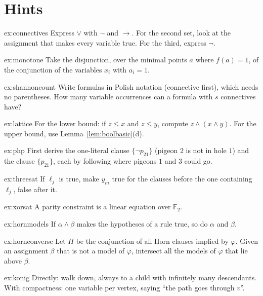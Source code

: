 \section{Hints}

\begin{hint}{ex:connectives}
Express $\lor$ with $\neg$ and $\to$. For the second set, look at the assignment that makes every variable true. For the
third, express $\neg$.
\end{hint}
\begin{hint}{ex:monotone}
Take the disjunction, over the minimal points $a$ where $f(a)=1$, of the conjunction of the variables $x_i$ with $a_i=1$.
\end{hint}
\begin{hint}{ex:shannoncount}
Write formulas in Polish notation (connective first), which needs no parentheses. How many variable occurrences can a
formula with $s$ connectives have?
\end{hint}
\begin{hint}{ex:lattice}
For the lower bound: if $z\le x$ and $z\le y$, compute $z\land(x\land y)$. For the upper bound, use Lemma~\ref{lem:boolbasic}(d).
\end{hint}
\begin{hint}{ex:php}
First derive the one-literal clause $\{\neg p_{21}\}$ (pigeon $2$ is not in hole $1$) and the clause $\{p_{21}\}$, each by
following where pigeons $1$ and $3$ could go.
\end{hint}
\begin{hint}{ex:threesat}
If $\ell_j$ is true, make $y_m$ true for the clauses before the one containing $\ell_j$, false after it.
\end{hint}
\begin{hint}{ex:xorsat}
A parity constraint is a linear equation over $\mathbb F_2$.
\end{hint}
\begin{hint}{ex:hornmodels}
If $\alpha\land\beta$ makes the hypotheses of a rule true, so do $\alpha$ and $\beta$.
\end{hint}
\begin{hint}{ex:hornconverse}
Let $H$ be the conjunction of all Horn clauses implied by $\varphi$. Given an assignment $\beta$ that is not a model of $\varphi$,
intersect all the models of $\varphi$ that lie above $\beta$.
\end{hint}
\begin{hint}{ex:konig}
Directly: walk down, always to a child with infinitely many descendants. With compactness: one variable per vertex,
saying ``the path goes through $v$''.
\end{hint}
